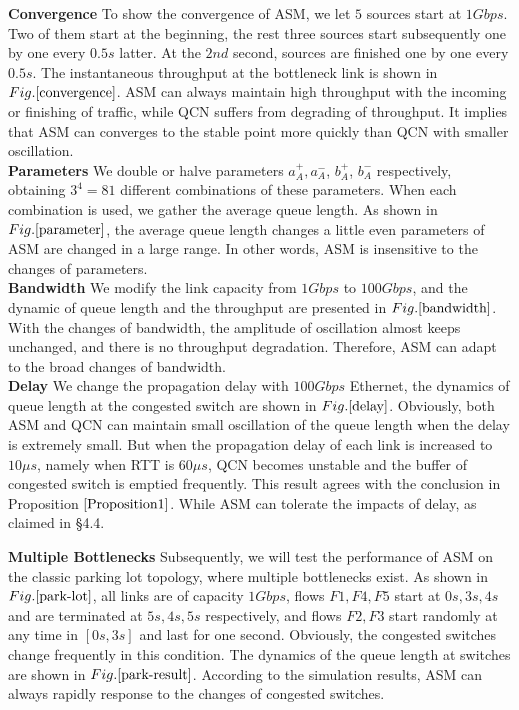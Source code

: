 \documentclass{sig-alternate-10pt}
\def\figurename{Fig.}
\begin{document}
\textbf{Convergence}
To show the convergence of ASM, we let $5$ sources start at $1Gbps$. Two of them start at the beginning, the rest three sources start subsequently one by one every $0.5s$ latter. At the $2nd$ second, sources are finished one by one every $0.5s$. The instantaneous throughput at the bottleneck link is shown in $\figurename{\ref{convergence}}$. ASM can always maintain high throughput with the incoming or finishing of traffic, while QCN suffers from degrading of throughput. It implies that ASM can converges to the stable point more quickly than QCN with smaller oscillation. \\
\textbf{Parameters} We double or halve parameters $a^+_A, a^-_A$, $b^+_A$, $b^-_A$ respectively, obtaining $3^4=81$ different combinations of these parameters. When each combination is used, we gather the average queue length. As shown in $\figurename{\ref{parameter}}$, the average queue length changes a little even parameters of ASM are changed in a large range. In other words, ASM is insensitive to the changes of parameters. \\
\textbf{Bandwidth}
We modify the link capacity from $1Gbps$ to $100Gbps$, and the dynamic of queue length and the throughput are presented in $\figurename{\ref{bandwidth}}$. With the changes of bandwidth, the amplitude of oscillation almost keeps unchanged, and there is no throughput degradation. Therefore, ASM can adapt to the broad changes of bandwidth.
\\
\textbf{Delay}
We change the propagation delay with $100Gbps$ Ethernet, the dynamics of queue length at the congested switch are shown in $\figurename{\ref{delay}}$. Obviously, both ASM and QCN can maintain small oscillation of the queue length when the delay is extremely small. But when the propagation delay of each link is increased to $10\mu s$, namely when RTT is $60\mu s$, QCN becomes unstable and the buffer of congested switch is emptied frequently. This result agrees with the conclusion in Proposition $\ref{Proposition1}$. While ASM can tolerate the impacts of delay, as claimed in \S4.4.

\noindent\textbf{Multiple Bottlenecks}
Subsequently, we will test the performance of ASM on the classic parking lot topology, where multiple bottlenecks exist. As shown in $\figurename\ref{park-lot}$, all links are of capacity $1Gbps$, flows $F1, F4, F5$ start at $0s, 3s, 4s$ and are terminated at $5s, 4s, 5s$ respectively, and flows $F2, F3$ start randomly at any time in $[0s, 3s]$ and last for one second. Obviously, the congested switches change frequently in this condition. The dynamics of the queue length at switches are shown in $\figurename\ref{park-result}$. According to the simulation results, ASM can always rapidly response to the changes of congested switches.
\end{document}
